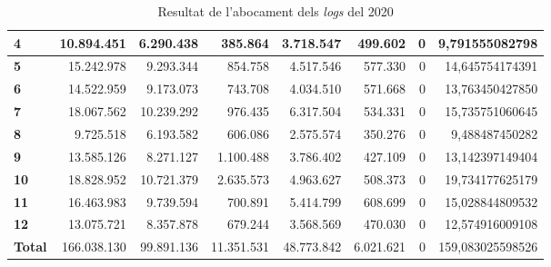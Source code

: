 \begin{table}[h!]
\begin{adjustbox}{width=1.5\textwidth, center}
\begin{tabular}{|l|r|r|r|r|r|r|r|}
            \textbf{4}     & 10.894.451  & 6.290.438  & 385.864    & 3.718.547  & 499.602   & 0 & 9,791555082798   \\
            \midrule
            \textbf{5}     & 15.242.978  & 9.293.344  & 854.758    & 4.517.546  & 577.330   & 0 & 14,645754174391  \\
            \textbf{6}     & 14.522.959  & 9.173.073  & 743.708    & 4.034.510  & 571.668   & 0 & 13,763450427850  \\
            \textbf{7}     & 18.067.562  & 10.239.292 & 976.435    & 6.317.504  & 534.331   & 0 & 15,735751060645  \\
            \textbf{8}     & 9.725.518   & 6.193.582  & 606.086    & 2.575.574  & 350.276   & 0 & 9,488487450282   \\
            \midrule
            \textbf{9}     & 13.585.126  & 8.271.127  & 1.100.488  & 3.786.402  & 427.109   & 0 & 13,142397149404  \\
            \textbf{10}    & 18.828.952  & 10.721.379 & 2.635.573  & 4.963.627  & 508.373   & 0 & 19,734177625179  \\
            \textbf{11}    & 16.463.983  & 9.739.594  & 700.891    & 5.414.799  & 608.699   & 0 & 15,028844809532  \\
            \textbf{12}    & 13.075.721  & 8.357.878  & 679.244    & 3.568.569  & 470.030   & 0 & 12,574916009108  \\
            \midrule
            \textbf{Total} & 166.038.130 & 99.891.136 & 11.351.531 & 48.773.842 & 6.021.621 & 0 & 159,083025598526 \\
            \bottomrule
        \end{tabular}
    \end{adjustbox}
    \caption{Resultat de l'abocament dels \textit{logs} del 2020}
    \label{tab:logs-table-2020}
\end{table}
